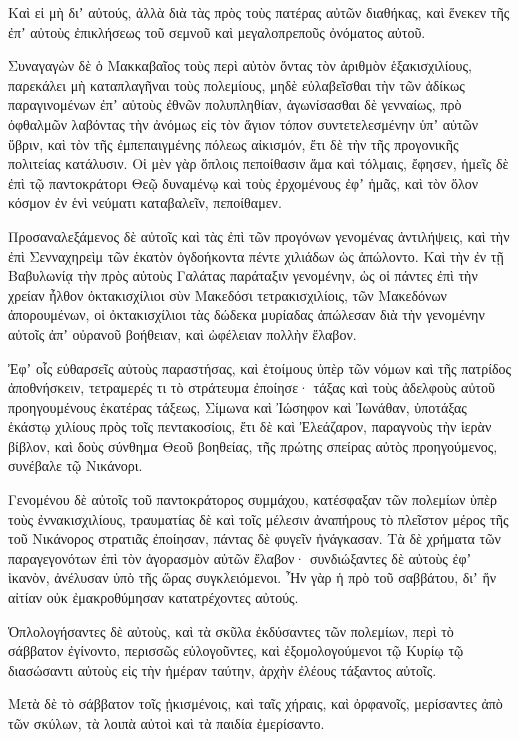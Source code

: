 {Καὶ εἰ μὴ διʼ αὐτούς, ἀλλὰ διὰ τὰς πρὸς τοὺς πατέρας αὐτῶν διαθήκας, καὶ ἕνεκεν τῆς ἐπʼ αὐτοὺς ἐπικλήσεως τοῦ σεμνοῦ καὶ μεγαλοπρεποῦς ὀνόματος αὐτοῦ.
\par }{\PP {}Συναγαγὼν δὲ ὁ Μακκαβαῖος τοὺς περὶ αὐτὸν ὄντας τὸν ἀριθμὸν ἑξακισχιλίους, παρεκάλει μὴ καταπλαγῆναι τοὺς πολεμίους, μηδὲ εὐλαβεῖσθαι τὴν τῶν ἀδίκως παραγινομένων ἐπʼ αὐτοὺς ἐθνῶν πολυπληθίαν, ἀγωνίσασθαι δὲ γενναίως,
πρὸ ὀφθαλμῶν λαβόντας τὴν ἀνόμως εἰς τὸν ἅγιον τόπον συντετελεσμένην ὑπʼ αὐτῶν ὕβριν, καὶ τὸν τῆς ἐμπεπαιγμένης πόλεως αἰκισμόν, ἔτι δὲ τὴν τῆς προγονικῆς πολιτείας κατάλυσιν.
Οἱ μὲν γὰρ ὅπλοις πεποίθασιν ἅμα καὶ τόλμαις, ἔφησεν, ἡμεῖς δὲ ἐπὶ τῷ παντοκράτορι Θεῷ δυναμένῳ καὶ τοὺς ἐρχομένους ἐφʼ ἡμᾶς, καὶ τὸν ὅλον κόσμον ἐν ἑνὶ νεύματι καταβαλεῖν, πεποίθαμεν.
\par }{\PP {}Προσαναλεξάμενος δὲ αὐτοῖς καὶ τὰς ἐπὶ τῶν προγόνων γενομένας ἀντιλήψεις, καὶ τὴν ἐπὶ Σενναχηρεὶμ τῶν ἑκατὸν ὀγδοήκοντα πέντε χιλιάδων ὡς ἀπώλοντο.
Καὶ τὴν ἐν τῇ Βαβυλωνίᾳ τὴν πρὸς αὐτοὺς Γαλάτας παράταξιν γενομένην, ὡς οἱ πάντες ἐπὶ τὴν χρείαν ἦλθον ὀκτακισχίλιοι σὺν Μακεδόσι τετρακισχιλίοις, τῶν Μακεδόνων ἀπορουμένων, οἱ ὀκτακισχίλιοι τὰς δώδεκα μυρίαδας ἀπώλεσαν διὰ τὴν γενομένην αὐτοῖς ἀπʼ οὐρανοῦ βοήθειαν, καὶ ὠφέλειαν πολλὴν ἔλαβον.
\par }{\PP {}Ἐφʼ οἷς εὐθαρσεῖς αὐτοὺς παραστήσας, καὶ ἑτοίμους ὑπὲρ τῶν νόμων καὶ τῆς πατρίδος ἀποθνήσκειν, τετραμερές τι τὸ στράτευμα ἐποίησε·
τάξας καὶ τοὺς ἀδελφοὺς αὐτοῦ προηγουμένους ἑκατέρας τάξεως, Σίμωνα καὶ Ἰώσηφον καὶ Ἰωνάθαν, ὑποτάξας ἑκάστῳ χιλίους πρὸς τοῖς πεντακοσίοις,
ἔτι δὲ καὶ Ἐλεάζαρον, παραγνοὺς τὴν ἱερὰν βίβλον, καὶ δοὺς σύνθημα Θεοῦ βοηθείας, τῆς πρώτης σπείρας αὐτὸς προηγούμενος, συνέβαλε τῷ Νικάνορι.
\par }{\PP {}Γενομένου δὲ αὐτοῖς τοῦ παντοκράτορος συμμάχου, κατέσφαξαν τῶν πολεμίων ὑπὲρ τοὺς ἐννακισχιλίους, τραυματίας δὲ καὶ τοῖς μέλεσιν ἀναπήρους τὸ πλεῖστον μέρος τῆς τοῦ Νικάνορος στρατιᾶς ἐποίησαν, πάντας δὲ φυγεῖν ἠνάγκασαν.
Τὰ δὲ χρήματα τῶν παραγεγονότων ἐπὶ τὸν ἀγορασμὸν αὐτῶν ἔλαβον· συνδιώξαντες δὲ αὐτοὺς ἐφʼ ἱκανὸν, ἀνέλυσαν ὑπὸ τῆς ὥρας συγκλειόμενοι.
Ἦν γὰρ ἡ πρὸ τοῦ σαββάτου, διʼ ἥν αἰτίαν οὐκ ἐμακροθύμησαν κατατρέχοντες αὐτούς.
\par }{\PP {}Ὁπλολογήσαντες δὲ αὐτοὺς, καὶ τὰ σκῦλα ἐκδύσαντες τῶν πολεμίων, περὶ τὸ σάββατον ἐγίνοντο, περισσῶς εὐλογοῦντες, καὶ ἐξομολογούμενοι τῷ Κυρίῳ τῷ διασώσαντι αὐτοὺς εἰς τὴν ἡμέραν ταύτην, ἀρχὴν ἐλέους τάξαντος αὐτοῖς.
\par }{\PP {}Μετὰ δὲ τὸ σάββατον τοῖς ᾐκισμένοις, καὶ ταῖς χήραις, καὶ ὀρφανοῖς, μερίσαντες ἀπὸ τῶν σκύλων, τὰ λοιπὰ αὐτοὶ καὶ τὰ παιδία ἐμερίσαντο.
}
